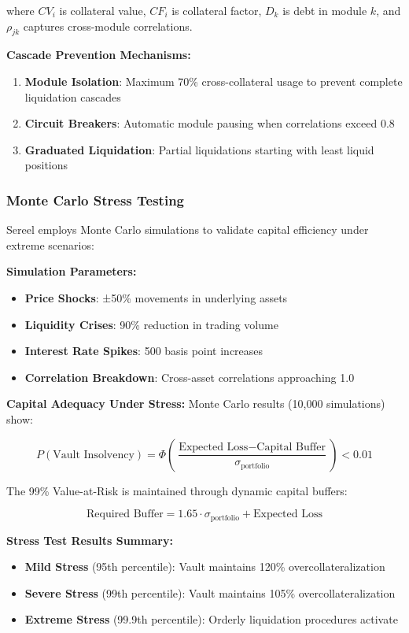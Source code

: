 \documentclass[12pt]{article}
\begin{document}
where $CV_i$ is collateral value, $CF_i$ is collateral factor, $D_k$ is debt in module $k$, and $\rho_{jk}$ captures cross-module correlations.

\textbf{Cascade Prevention Mechanisms:}
\begin{enumerate}
\item \textbf{Module Isolation}: Maximum 70\% cross-collateral usage to prevent complete liquidation cascades
\item \textbf{Circuit Breakers}: Automatic module pausing when correlations exceed 0.8
\item \textbf{Graduated Liquidation}: Partial liquidations starting with least liquid positions
\end{enumerate}

\subsubsection{Monte Carlo Stress Testing}

Sereel employs Monte Carlo simulations to validate capital efficiency under extreme scenarios:

\textbf{Simulation Parameters:}
\begin{itemize}
\item \textbf{Price Shocks}: ±50\% movements in underlying assets
\item \textbf{Liquidity Crises}: 90\% reduction in trading volume
\item \textbf{Interest Rate Spikes}: 500 basis point increases
\item \textbf{Correlation Breakdown}: Cross-asset correlations approaching 1.0
\end{itemize}

\textbf{Capital Adequacy Under Stress:}
Monte Carlo results (10,000 simulations) show:

\begin{equation}
P(\text{Vault Insolvency}) = \Phi\left(\frac{\text{Expected Loss} - \text{Capital Buffer}}{\sigma_{\text{portfolio}}}\right) < 0.01
\end{equation}

The 99\% Value-at-Risk is maintained through dynamic capital buffers:

\begin{equation}
\text{Required Buffer} = 1.65 \cdot \sigma_{\text{portfolio}} + \text{Expected Loss}
\end{equation}

\textbf{Stress Test Results Summary:}
\begin{itemize}
\item \textbf{Mild Stress} (95th percentile): Vault maintains 120\% overcollateralization
\item \textbf{Severe Stress} (99th percentile): Vault maintains 105\% overcollateralization  
\item \textbf{Extreme Stress} (99.9th percentile): Orderly liquidation procedures activate
\end{itemize}
\end{document}
